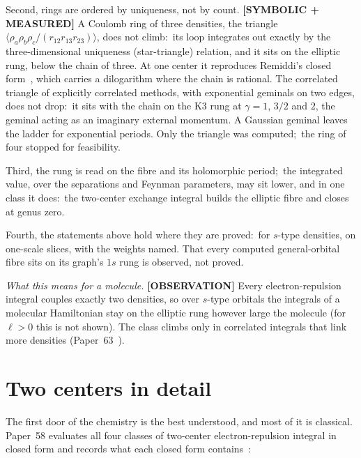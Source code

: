 \documentclass[aps,pra,twocolumn,superscriptaddress,longbibliography]{revtex4-2}
\newcommand{\gvc}[2]{#2}
\begin{document}
Second, rings are ordered by uniqueness, not by count.
\textbf{[SYMBOLIC + MEASURED]} A Coulomb ring of three densities, the
triangle $\langle\rho_a\rho_b\rho_c/(r_{12}r_{13}r_{23})\rangle$, does
not climb:\ its loop integrates out exactly by the three-dimensional
uniqueness (star-triangle) relation, and it sits on the elliptic rung,
below the chain of three.  At one center it reproduces Remiddi's closed
form~\cite{remiddi1991,ppr2004}, which carries a dilogarithm where the
chain is rational.  The correlated triangle of explicitly correlated
methods, with exponential geminals on two edges, does not drop:\ it sits
with the chain on the K3 rung at $\gamma=1$, $3/2$ and $2$, the geminal
acting as an imaginary external momentum.  A Gaussian geminal leaves the
ladder for exponential periods.  Only the triangle was computed;\ the
ring of four stopped for feasibility.

Third, the rung is read on the fibre and its holomorphic period;\ the
integrated value, over the separations and Feynman parameters, may sit
lower, and in one class it does:\ the two-center exchange integral builds the elliptic fibre
and closes at genus zero.

Fourth, the statements above hold where they are proved:\ for $s$-type
densities, on one-scale slices, with the weights named.  That every
computed general-orbital fibre sits on its graph's $1s$ rung is observed,
not proved.

\emph{What this means for a molecule.}  \textbf{[OBSERVATION]}
\gvc{p63-hamiltonian-elliptic-stype}{Every electron-repulsion integral
couples exactly two densities, so over $s$-type orbitals the integrals of
a molecular Hamiltonian stay on the elliptic rung however large the
molecule (for $\ell>0$ this is not shown)}.  The class climbs only in
correlated integrals that link more densities
(Paper~63~\cite{loutey_paper63}).

\section{Two centers in detail}
\label{sec:two}

The first door of the chemistry is the best understood, and most of it
is classical.  Paper~58 evaluates all four classes of two-center
electron-repulsion integral in closed form and records what each closed
form contains~\cite{loutey_paper58}:
\end{document}
